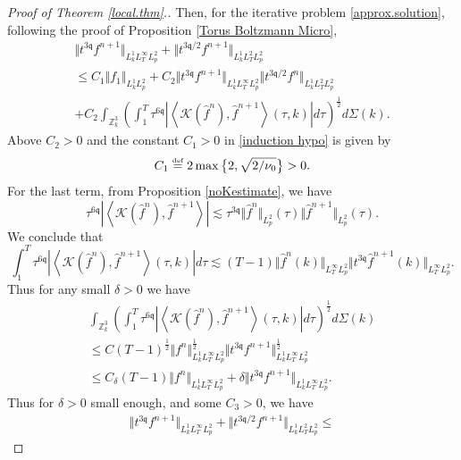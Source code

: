 \documentclass[reqno]{amsart}
\newcommand{\eqdef }{\overset{\mbox{\tiny{def}}}{=}}
\newcommand{\pv}{p}
\def\norm#1{\big\Vert#1\big\Vert}
\newcommand{\irnp}[2]{\left\langle {#1},{#2} \right\rangle}
\newcommand{\qq}{\mathfrak{q}}
\newcommand{\tTq}{t^{3\qq}}
\newcommand{\compK}{\mathcal{K}}
\newcommand{\Z}{\mathbb{Z}}
\theoremstyle{definition}
\numberwithin{equation}{section}
\numberwithin{theorem}{section}
\begin{document}
\begin{proof}[Proof of Theorem \ref{local.thm}.]
Then, for the iterative problem \eqref{approx.solution}, following the proof of Proposition \ref{Torus Boltzmann Micro}, 
\begin{multline*}
    \norm{\tTq f^{n+1}}_{L^1_kL^\infty_TL^2_{\pv}}
+
{\norm{t^{3\qq/2} f^{n+1}}_{L^1_kL^2_TL^2_{\pv}}}
\\
\leq
C_1\Vert {f}_1\Vert_{L^1_kL^2_{\pv}}
+
C_2{\Vert{\tTq f^{n+1}}\Vert_{L^1_kL^\infty_TL^2_{\pv}}} {\norm{t^{3\qq/2} f^{n}}_{L^1_kL^2_TL^2_{\pv}}}
\\
+
C_2
\int_{\Z^3_k} \left(\int^T_1 \tau^{6\qq} \left|{\irnp{\compK(\hat{f}^{n})}{\hat{f}^{n+1}}}(\tau, k)\right|
d\tau \right)^{\frac12} d\Sigma(k).
\end{multline*}
Above $C_2>0$ and the constant $C_1>0$ in \eqref{induction hypo} is given by
\begin{equation*}
    C_1\eqdef 2\max\big\{2,\sqrt{2/\nu_0}\big\}>0.
\end{equation*}
For the last term, from Proposition \ref{noKestimate}, we have 
\begin{equation*}
     \tau^{6\qq} \left|\irnp{\compK (\widehat{f}^{n})}{\widehat{f}^{n+1}}\right|
\lesssim
\tau^{3\qq}
\norm{\widehat{f}^{n}}_{L^2_{\pv}}(\tau)
\norm{\widehat{f}^{n+1} }_{L^2_{\pv}}(\tau).
\end{equation*}
We conclude that 
\begin{equation*}
        \int^{T}_1 \tau^{6\qq} 
\left|\irnp{\compK (\widehat{f}^{n})}{\widehat{f}^{n+1}}(\tau, k)\right|
d\tau
\lesssim
(T-1) \norm{ \widehat{f}^{n}(k) }_{L^\infty_{T}L^2_{\pv}}
\norm{t^{3\qq} \widehat{f}^{n+1}(k)}_{L^\infty_{T}L^2_{\pv}}.
\end{equation*}
Thus for any small $\delta>0$ we have 
\begin{multline*}
\int_{\Z^3_k} \left(\int^T_1 \tau^{6\qq} \left|{\irnp{\compK(\hat{f}^{n})}{\hat{f}^{n+1}}}(\tau, k)\right|
d\tau \right)^{\frac12} d\Sigma(k)
\\
\leq
C (T-1)^{\frac{1}{2}} \norm{ {f}^{n} }_{L^1_k L^\infty_{T}L^2_{\pv}}^{\frac{1}{2}}
\norm{t^{3\qq} {f}^{n+1}}_{L^1_k L^\infty_{T}L^2_{\pv}}^{\frac{1}{2}}
\\
\leq
 C_\delta (T-1) \norm{ {f}^{n} }_{L^1_k L^\infty_{T}L^2_{\pv}}
 +
 \delta
\norm{t^{3\qq} {f}^{n+1}}_{L^1_k L^\infty_{T}L^2_{\pv}}.
\end{multline*}
Thus for $\delta>0$ small enough, and some $C_3>0$, we have
\begin{multline*}
    \norm{\tTq f^{n+1}}_{L^1_kL^\infty_TL^2_{\pv}}
+
{\norm{t^{3\qq/2} f^{n+1}}_{L^1_kL^2_TL^2_{\pv}}}
\leq

\end{multline*}
\end{proof}
\end{document}
